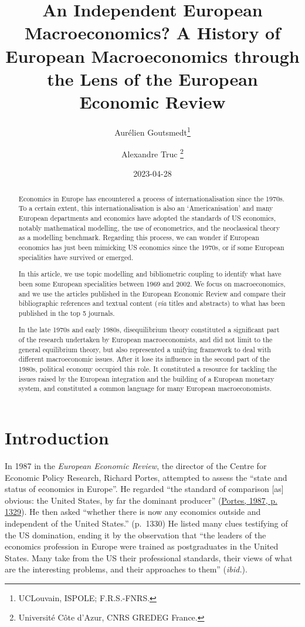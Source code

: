 \documentclass[
  12pt,
  onecolumn]{article}
\title{An Independent European Macroeconomics? A History of European
Macroeconomics through the Lens of the European Economic Review}
\author{Aurélien Goutsmedt\footnote{UCLouvain, ISPOLE; F.R.S.-FNRS.} \and Alexandre
Truc \footnote{Université Côte d'Azur, CNRS GREDEG France.}}
\date{2023-04-28}
\begin{document}
\maketitle
\begin{abstract}
Economics in Europe has encountered a process of internationalisation
since the 1970s. To a certain extent, this internationalisation is also
an `Americanisation' and many European departments and economics have
adopted the standards of US economics, notably mathematical modelling,
the use of econometrics, and the neoclassical theory as a modelling
benchmark. Regarding this process, we can wonder if European economics
has just been mimicking US economics since the 1970s, or if some
European specialities have survived or emerged.

In this article, we use topic modelling and bibliometric coupling to
identify what have been some European specialities between 1969 and
2002. We focus on macroeconomics, and we use the articles published in
the European Economic Review and compare their bibliographic references
and textual content (\emph{via} titles and abstracts) to what has been
published in the top 5 journals.

In the late 1970s and early 1980s, disequilibrium theory constituted a
significant part of the research undertaken by European macroeconomists,
and did not limit to the general equilibrium theory, but also
represented a unifying framework to deal with different macroeconomic
issues. After it lose its influence in the second part of the 1980s,
political economy occupied this role. It constituted a resource for
tackling the issues raised by the European integration and the building
of a European monetary system, and constituted a common language for
many European macroeconomists.
\end{abstract}

\hypertarget{introduction}{%
\section{Introduction}\label{introduction}}

In 1987 in the \emph{European Economic Review}, the director of the
Centre for Economic Policy Research, Richard Portes, attempted to assess
the ``state and status of economics in Europe''. He regarded ``the
standard of comparison {[}as{]} obvious: the United States, by far the
dominant producer'' (\protect\hyperlink{ref-portes1987}{Portes, 1987, p.
1329}). He then asked ``whether there is now any economics outside and
independent of the United States.'' (p.~1330) He listed many clues
testifying of the US domination, ending it by the observation that ``the
leaders of the economics profession in Europe were trained as
postgraduates in the United States. Many take from the US their
professional standards, their views of what are the interesting
problems, and their approaches to them'' (\emph{ibid.}).
\end{document}
